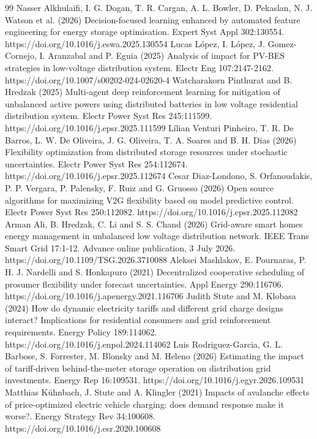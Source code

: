 \documentclass[pdflatex,Numbered,sn-basic]{sn-jnl}
\begin{document}
\begin{thebibliography}{99}
 Nasser Alkhulaifi, I. G. Dogan, T. R. Cargan, A. L. Bowler, D. Pekaslan, N. J. Watson et al. (2026) Decision-focused learning enhanced by automated feature engineering for energy storage optimisation. Expert Syst Appl 302:130554. https://doi.org/10.1016/j.eswa.2025.130554
 Lucas López, I. López, J. Gomez-Cornejo, I. Aranzabal and P. Eguia (2025) Analysis of impact for PV-BES strategies in low-voltage distribution system. Electr Eng 107:2147-2162. https://doi.org/10.1007/s00202-024-02620-4
 Watcharakorn Pinthurat and B. Hredzak (2025) Multi-agent deep reinforcement learning for mitigation of unbalanced active powers using distributed batteries in low voltage residential distribution system. Electr Power Syst Res 245:111599. https://doi.org/10.1016/j.epsr.2025.111599
 Lílian Venturi Pinheiro, T. R. De Barros, L. W. De Oliveira, J. G. Oliveira, T. A. Soares and B. H. Dias (2026) Flexibility optimization from distributed storage resources under stochastic uncertainties. Electr Power Syst Res 254:112674. https://doi.org/10.1016/j.epsr.2025.112674
 Cesar Diaz-Londono, S. Orfanoudakis, P. P. Vergara, P. Palensky, F. Ruiz and G. Gruosso (2026) Open source algorithms for maximizing V2G flexibility based on model predictive control. Electr Power Syst Res 250:112082. https://doi.org/10.1016/j.epsr.2025.112082
 Arman Ali, B. Hredzak, C. Li and S. S. Chand (2026) Grid-aware smart homes energy management in unbalanced low voltage distribution network. IEEE Trans Smart Grid 17:1-12. Advance online publication, 3 July 2026. https://doi.org/10.1109/TSG.2026.3710088
 Aleksei Mashlakov, E. Pournaras, P. H. J. Nardelli and S. Honkapuro (2021) Decentralized cooperative scheduling of prosumer flexibility under forecast uncertainties. Appl Energy 290:116706. https://doi.org/10.1016/j.apenergy.2021.116706
 Judith Stute and M. Klobasa (2024) How do dynamic electricity tariffs and different grid charge designs interact? Implications for residential consumers and grid reinforcement requirements. Energy Policy 189:114062. https://doi.org/10.1016/j.enpol.2024.114062
 Luis Rodriguez-Garcia, G. L. Barbose, S. Forrester, M. Blonsky and M. Heleno (2026) Estimating the impact of tariff-driven behind-the-meter storage operation on distribution grid investments. Energy Rep 16:109531. https://doi.org/10.1016/j.egyr.2026.109531
 Matthias Kühnbach, J. Stute and A. Klingler (2021) Impacts of avalanche effects of price-optimized electric vehicle charging: does demand response make it worse?. Energy Strategy Rev 34:100608. https://doi.org/10.1016/j.esr.2020.100608

\end{thebibliography}
\end{document}

